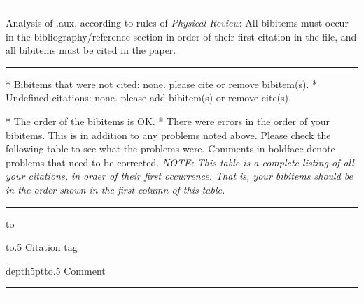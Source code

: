 \hrule height2pt
\bigskip
Analysis of \filename.aux, according to rules of
{\it Physical Review\/}: All bibitems must occur in the
bibliography/reference section in order of their first citation in the
file, and all bibitems must be cited in the paper.
\bigskip
\hrule height2pt
\bigskip \bigskip

* Bibitems that were not cited:
\ifx\uncitedbibs\empty none.
\else \uncitedbibs please cite or remove bibitem(s).
\fi
\vskip1pc
* Undefined citations:
\ifx\undefinedcites\empty none.
\else \undefinedcites please add bibitem(s) or remove cite(s).
\fi

\vskip1pc
\ifnum{}
* The order of the bibitems is OK.
\else
* There were \the\errcount\space
errors in the order of your bibitems. This
is in addition to any problems noted above. Please
check the following table to see what the problems were.
Comments
in boldface denote problems that need to be corrected.
{\it NOTE:
This table is a complete listing of all your citations, in order of their
first occurrence. That is, your bibitems should be in the order shown
in the first column of this table.
}
\smallskip \small
\hrule
\hbox to\hsize
{\vrule\hbox to.5\hsize
{\hss Citation tag\hss}%
\hss\vrule\hss\strut depth5pt\hbox to.5\hsize
{\hss Comment\hss}\vrule}%
\hrule
\smallskip
\hrule
\ordertable %
\fi

\typeout{}



%
